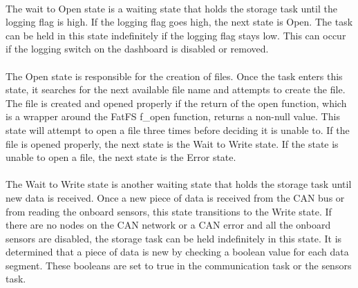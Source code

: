 \paragraph{}
The wait to Open state is a waiting state that holds the storage task until the logging flag is high.
If the logging flag goes high, the next state is Open.
The task can be held in this state indefinitely if the logging flag stays low.
This can occur if the logging switch on the dashboard is disabled or removed.

\paragraph{}
The Open state is responsible for the creation of files.
Once the task enters this state, it searches for the next available file name and attempts to create the file.
The file is created and opened properly if the return of the open function, which is a wrapper around the FatFS f\_open function, returns a non-null value.
This state will attempt to open a file three times before deciding it is unable to.
If the file is opened properly, the next state is the Wait to Write state.
If the state is unable to open a file, the next state is the Error state.

\paragraph{}
The Wait to Write state is another waiting state that holds the storage task until new data is received.
Once a new piece of data is received from the CAN bus or from reading the onboard sensors, this state transitions to the Write state.
If there are no nodes on the CAN network or a CAN error and all the onboard sensors are disabled, the storage task can be held indefinitely in this state.
It is determined that a piece of data is new by checking a boolean value for each data segment.
These booleans are set to true in the communication task or the sensors task.

